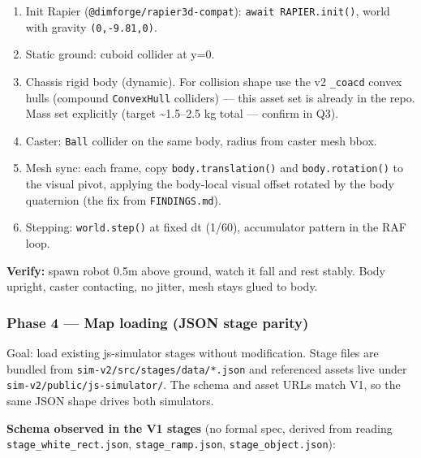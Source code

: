 \documentclass[
]{article}
\providecommand{\tightlist}{%
  \setlength{\itemsep}{0pt}\setlength{\parskip}{0pt}}
\begin{document}
\begin{enumerate}
\def\labelenumi{\arabic{enumi}.}
\tightlist
\item
  Init Rapier (\texttt{@dimforge/rapier3d-compat}):
  \texttt{await\ RAPIER.init()}, world with gravity
  \texttt{(0,-9.81,0)}.
\item
  Static ground: cuboid collider at y=0.
\item
  Chassis rigid body (dynamic). For collision shape use the v2
  \texttt{\_coacd} convex hulls (compound \texttt{ConvexHull} colliders)
  --- this asset set is already in the repo. Mass set explicitly (target
  \textasciitilde1.5--2.5 kg total --- confirm in Q3).
\item
  Caster: \texttt{Ball} collider on the same body, radius from caster
  mesh bbox.
\item
  Mesh sync: each frame, copy \texttt{body.translation()} and
  \texttt{body.rotation()} to the visual pivot, applying the body-local
  visual offset rotated by the body quaternion (the fix from
  \texttt{FINDINGS.md}).
\item
  Stepping: \texttt{world.step()} at fixed dt (1/60), accumulator
  pattern in the RAF loop.
\end{enumerate}

\textbf{Verify:} spawn robot 0.5m above ground, watch it fall and rest
stably. Body upright, caster contacting, no jitter, mesh stays glued to
body.

\subsubsection{Phase 4 --- Map loading (JSON stage
parity)}\label{phase-4-map-loading-json-stage-parity}

Goal: load existing js-simulator stages without modification. Stage
files are bundled from \texttt{sim-v2/src/stages/data/*.json} and
referenced assets live under \texttt{sim-v2/public/js-simulator/}. The
schema and asset URLs match V1, so the same JSON shape drives both
simulators.

\textbf{Schema observed in the V1 stages} (no formal spec, derived from
reading \texttt{stage\_white\_rect.json}, \texttt{stage\_ramp.json},
\texttt{stage\_object.json}):
\end{document}
